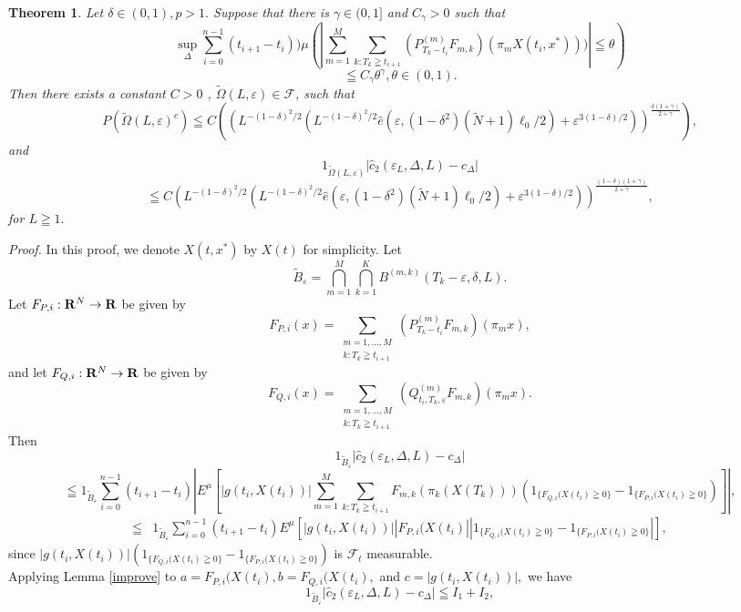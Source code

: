 \documentclass[12pt]{article}
\newtheorem{thm}{Theorem}%
\begin{document}
\begin{thm}
Let $\delta \in (0,1), p>1.$ 
Suppose that there is $ \gamma \in (0,1]$  and $C_{\gamma} >0$ such that
  $$\sup_{\Delta} \sum_{i=0}^{n-1} (t_{i+1}-t_i)){\mu} (| \sum_{m=1}^M\sum_{k:T_k\geqq t_{i+1}} (P_{T_k-t_i}^{(m)}F_{m,k})(\pi_m X(t_i,x^*)))| \leqq \theta )$$
$$ \leqq C_{\gamma}\theta^{\gamma}, \theta\in(0,1).$$
Then there exists a constant $C>0$ , $\tilde{\Omega}(L, \varepsilon) \in \mathcal{F}$, such that
$$P( \tilde{\Omega}(L,\varepsilon)^c ) \leqq C \left( \left(
L^{-(1-\delta)^2/2} \left( L^{-(1-\delta)^2/2} \hat{e}\left(\varepsilon,(1-\delta^2)(\tilde{N}+1)\ell_0/2 \right)+\varepsilon^{3(1-\delta)/2} \right)
  \right)^{\frac{ \delta(1+\gamma)}{2+\gamma}} \right),$$
and
$$
1_{\tilde{\Omega}(L,\varepsilon)}|\hat{c}_2(\varepsilon_L,\Delta,L)-c_{\Delta}|$$
$$\leqq  C\left(
L^{-(1-\delta)^2/2} \left( L^{-(1-\delta)^2/2} \hat{e}\left(\varepsilon,(1-\delta^2)(\tilde{N}+1)\ell_0/2 \right)+\varepsilon^{3(1-\delta)/2} \right)
  \right)^{\frac{(1-\delta)(1+\gamma)}{2+\gamma}}, $$
  for $ L \geqq 1.$
\end{thm}
{\it Proof.}
In this proof, we denote $X(t,x^*)$ by $X(t)$ for simplicity.
Let $$\tilde{B}_{\varepsilon} = \bigcap_{m=1}^M \bigcap_{k=1}^K B^{(m,k)}(T_k-\varepsilon, \delta,L).$$
Let $F_{P,i } : {\bf R}^N \to {\bf R}$ be given by
$$F_{P,i }(x) = \sum_{\substack{m=1,\ldots,M \\ k:T_k\geqq t_{i+1}}} (P_{T_k-t_i}^{(m)} F_{m,k}) (\pi_m x),$$
and let $F_{Q,i } : {\bf R}^N \to {\bf R}$ be given by
$$F_{Q,i }(x)=\sum_{\substack{m=1,\ldots,M \\ k:T_k\geqq t_{i+1}} } (Q_{t_i,T_k, \varepsilon}^{(m)}F_{m,k})(\pi_m x).$$
Then
$$1_{\tilde{B}_{\varepsilon} }|\hat{c}_2(\varepsilon_L,\Delta,L)-c_{\Delta}|$$
 $$
  \leqq 1_{\tilde{B}_{\varepsilon} }\sum_{i=0}^{n-1}(t_{i+1}-t_i)
|E ^{\mu}[|g(t_i, X(t_i))|\sum_{m=1}^M \sum_{k:T_k\geqq t_{i+1}}F_{m,k} (\pi_k (X(T_k)))
(1_{\{F_{Q,i}(X(t_i) \geqq 0\}} -1_{\{F_{P,i}(X(t_i) \geqq 0\}})]|,$$
  \begin{align*} 
   \leqq &1_{\tilde{B}_{\varepsilon} } \sum_{i=0}^{n-1}(t_{i+1}-t_i)
E ^{\mu}[|g(t_i, X(t_i))||F_{P,i}(X(t_i)| 
|1_{\{F_{Q,i}(X(t_i) \geqq 0\}} -1_{\{F_{P,i}(X(t_i) \geqq 0\}}|],
 \end{align*}
since $|g(t_i, X(t_i))|(1_{\{F_{Q,i}(X(t_i) \geqq 0\}} -1_{\{F_{P,i}(X(t_i) \geqq 0\}})$ is $\mathcal{F}_t$ measurable.
 \\
Applying Lemma \ref{improve} to $a = F_{P,i}(X(t_i), b = F_{Q,i}(X(t_i),$ and $c=|g(t_i, X(t_i))|,$ we have
$$1_{\tilde{B}_{\varepsilon} }|\hat{c}_2(\varepsilon_L,\Delta,L)-c_{\Delta}|\leqq I_1 +I_2, $$
\end{document}
